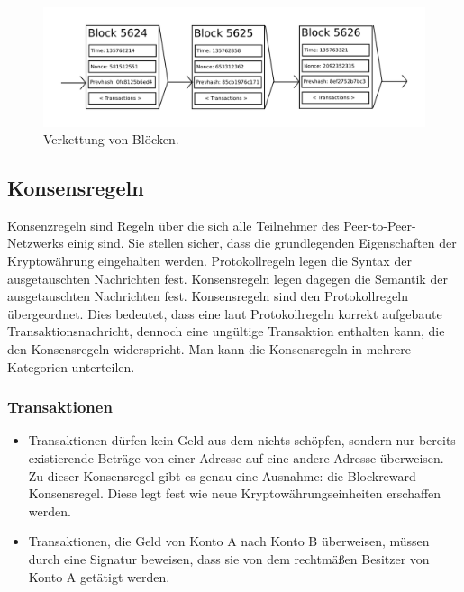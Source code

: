 \begin{figure}
\centering
\includegraphics[width=1\linewidth]{Figures/blockchain_ETH_white_paper}
\decoRule
\caption[Kette von Blöcken]{Verkettung von Blöcken.}
\label{fig:blockchain_ETH_white_paper}
\end{figure}



\subsection{Konsensregeln}

Konsenzregeln sind Regeln über die sich alle Teilnehmer des Peer-to-Peer-Netzwerks einig sind. Sie stellen sicher, dass die grundlegenden Eigenschaften der Kryptowährung eingehalten werden. Protokollregeln legen die Syntax der ausgetauschten Nachrichten fest. Konsensregeln legen dagegen die Semantik der ausgetauschten Nachrichten fest. 
Konsensregeln sind den Protokollregeln übergeordnet. Dies bedeutet, dass eine laut Protokollregeln korrekt aufgebaute Transaktionsnachricht, dennoch eine ungültige Transaktion enthalten kann, die den Konsensregeln widerspricht.
Man kann die Konsensregeln in mehrere Kategorien unterteilen.
\subsubsection{Transaktionen}

\begin{itemize}
\item Transaktionen dürfen kein Geld aus dem nichts schöpfen, sondern nur bereits existierende Beträge von einer Adresse auf eine andere Adresse überweisen. Zu dieser Konsensregel gibt es genau eine Ausnahme: die Blockreward-Konsensregel. Diese legt fest wie neue Kryptowährungseinheiten erschaffen werden.
\item Transaktionen, die Geld von Konto A nach Konto B überweisen, müssen durch eine Signatur beweisen, dass sie von dem rechtmäßen Besitzer von Konto A getätigt werden.
\end{itemize}

